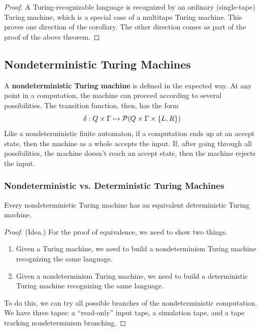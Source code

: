 \documentclass[letterpaper]{article}
\begin{document}
\begin{mdframed}[]
    \begin{proof}
        A Turing-recognizable language is recognized by an ordinary (single-tape) Turing machine, which is a special case of a multitape Turing machine. This proves one direction of the corollary. The other direction comes as part of the proof of the above theorem. 
    \end{proof}
\end{mdframed}

\subsection{Nondeterministic Turing Machines}
A \textbf{nondeterministic Turing machine} is defined in the expected way. At any point in a computation, the machine can proceed according to several possibilities. The transition function, then, has the form 
\[\delta: Q \times \Gamma \mapsto \mathcal{P}(Q \times \Gamma \times \{L, R\})\]
Like a nondeterministic finite automaton, if a computation ends up at an accept state, then the machine as a whole accepts the input. If, after going through all possibilities, the machine doesn't reach an accept state, then the machine rejects the input.  

\subsubsection{Nondeterministic vs. Deterministic Turing Machines}
\begin{theorem}{}{}
    Every nondeterministic Turing machine has an equivalent deterministic Turing machine. 
\end{theorem}

\begin{mdframed}[]
    \begin{proof}
        (Idea.) For the proof of equivalence, we need to show two things. 
        \begin{enumerate}
            \item Given a Turing machine, we need to build a nondeterminism Turing machine recognizing the same language. 
            \item Given a nondeterminism Turing machine, we need to build a deterministic Turing machine recognizing the same language. 
        \end{enumerate}
        To do this, we can try all possible branches of the nondeterministic computation. We have three tapes: a ``read-only'' input tape, a simulation tape, and a tape tracking nondeterminism branching. 
    \end{proof}
\end{mdframed}
\end{document}
